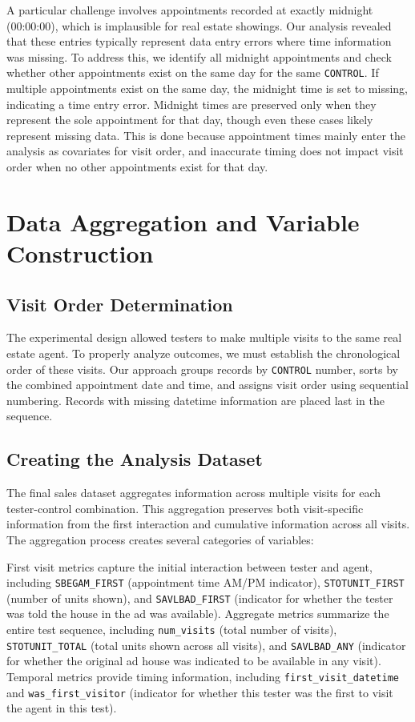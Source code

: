 \documentclass{article}
\begin{document}
A particular challenge involves appointments recorded at exactly midnight (00:00:00), which is implausible for real estate showings. Our analysis revealed that these entries typically represent data entry errors where time information was missing. To address this, we identify all midnight appointments and check whether other appointments exist on the same day for the same \texttt{CONTROL}. If multiple appointments exist on the same day, the midnight time is set to missing, indicating a time entry error. Midnight times are preserved only when they represent the sole appointment for that day, though even these cases likely represent missing data. This is done because appointment times mainly enter the analysis as covariates for visit order, and inaccurate timing does not impact visit order when no other appointments exist for that day.

\section{Data Aggregation and Variable Construction}

\subsection{Visit Order Determination}

The experimental design allowed testers to make multiple visits to the same real estate agent. To properly analyze outcomes, we must establish the chronological order of these visits. Our approach groups records by \texttt{CONTROL} number, sorts by the combined appointment date and time, and assigns visit order using sequential numbering. Records with missing datetime information are placed last in the sequence.

\subsection{Creating the Analysis Dataset}

The final sales dataset aggregates information across multiple visits for each tester-control combination. This aggregation preserves both visit-specific information from the first interaction and cumulative information across all visits. The aggregation process creates several categories of variables:

First visit metrics capture the initial interaction between tester and agent, including \texttt{SBEGAM\_FIRST} (appointment time AM/PM indicator), \texttt{STOTUNIT\_FIRST} (number of units shown), and \texttt{SAVLBAD\_FIRST} (indicator for whether the tester was told the house in the ad was available). Aggregate metrics summarize the entire test sequence, including \texttt{num\_visits} (total number of visits), \texttt{STOTUNIT\_TOTAL} (total units shown across all visits), and \texttt{SAVLBAD\_ANY} (indicator for whether the original ad house was indicated to be available in any visit). Temporal metrics provide timing information, including \texttt{first\_visit\_datetime} and \texttt{was\_first\_visitor} (indicator for whether this tester was the first to visit the agent in this test).
\end{document}
